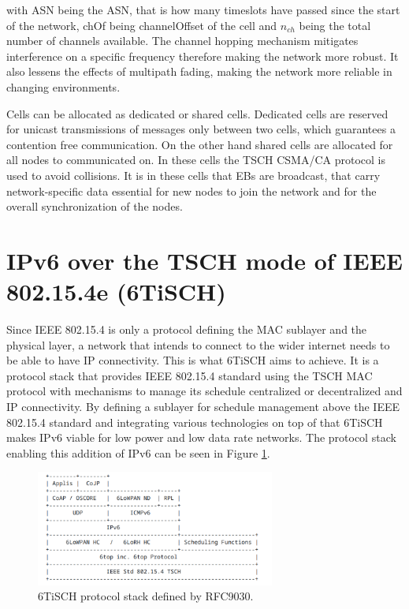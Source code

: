 \documentclass{comnets-thesis}
\begin{document}
with ASN being the \ac{ASN}, that is how many timeslots have passed since the start of the network, chOf being channelOffset of the cell and \( n_{ch} \) being the total number of channels available.
The channel hopping mechanism mitigates interference on a specific frequency therefore making the network more robust. It also lessens the effects of multipath fading, making the network more reliable in changing environments.

Cells can be allocated as dedicated or shared cells. Dedicated cells are reserved for unicast transmissions of messages only between two cells, which guarantees a contention free communication. On the other hand shared cells are allocated for all nodes to communicated on. In these cells the \ac{TSCH} \ac{CSMA/CA} protocol is used to avoid collisions.
It is in these cells that \acp{EB} are broadcast, that carry network-specific data essential for new nodes to join the network and for the overall synchronization of the nodes.



\section{IPv6 over the \ac{TSCH} mode of IEEE 802.15.4e (6TiSCH)}
Since IEEE 802.15.4 is only a protocol defining the \ac{MAC} sublayer and the physical layer, a network that intends to connect to the wider internet needs to be able to have IP connectivity. This is what \acf{6TiSCH} \cite{RFC9030} aims to achieve. It is a protocol stack that provides IEEE 802.15.4 standard using the TSCH MAC protocol with mechanisms to manage its schedule centralized or decentralized and IP connectivity. By defining a sublayer for schedule management above the IEEE 802.15.4 standard and integrating various technologies on top of that \ac{6TiSCH} makes IPv6 viable for low power and low data rate networks. The protocol stack enabling this addition of IPv6 can be seen in Figure \ref{fig:6tisch-protocol-stack}.

\begin{figure}
    \centering
    \includegraphics[width=0.7\textwidth]{./images/RFC0768 6TiSCH protocol stack.png}
    \caption{6TiSCH protocol stack defined by RFC9030. \cite{RFC9030}}
    \label{fig:6tisch-protocol-stack}
\end{figure}
\end{document}
